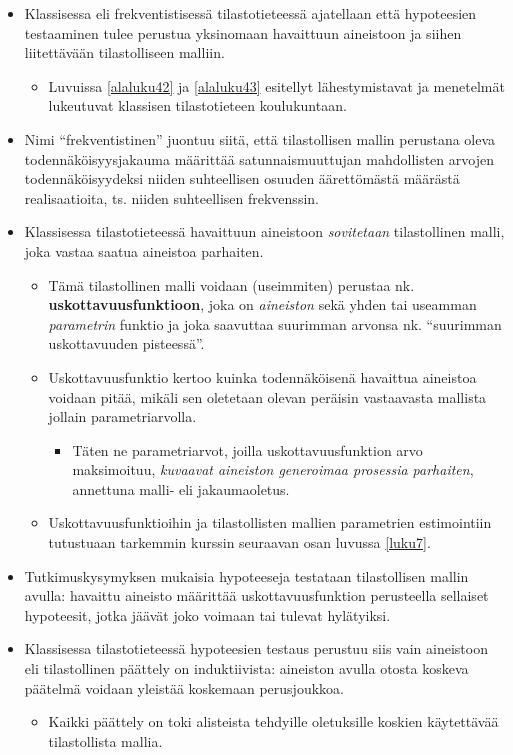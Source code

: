 \documentclass[
]{book}
\providecommand{\tightlist}{%
  \setlength{\itemsep}{0pt}\setlength{\parskip}{0pt}}
\begin{document}
\begin{itemize}
\item
  Klassisessa eli frekventistisessä tilastotieteessä ajatellaan että hypoteesien testaaminen tulee perustua yksinomaan havaittuun aineistoon ja siihen liitettävään tilastolliseen malliin.

  \begin{itemize}
  \tightlist
  \item
    Luvuissa \ref{alaluku42} ja \ref{alaluku43} esitellyt lähestymistavat ja menetelmät lukeutuvat klassisen tilastotieteen koulukuntaan.
  \end{itemize}
\item
  Nimi ``frekventistinen'' juontuu siitä, että tilastollisen mallin perustana oleva todennäköisyysjakauma määrittää satunnaismuuttujan mahdollisten arvojen todennäköisyydeksi niiden suhteellisen osuuden äärettömästä määrästä realisaatioita, ts. niiden suhteellisen frekvenssin.
\item
  Klassisessa tilastotieteessä havaittuun aineistoon \emph{sovitetaan} tilastollinen malli, joka vastaa saatua aineistoa parhaiten.

  \begin{itemize}
  \tightlist
  \item
    Tämä tilastollinen malli voidaan (useimmiten) perustaa nk. \textbf{uskottavuusfunktioon}, joka on \emph{aineiston} sekä yhden tai useamman \emph{parametrin} funktio ja joka saavuttaa suurimman arvonsa nk. ``suurimman uskottavuuden pisteessä''.
  \item
    Uskottavuusfunktio kertoo kuinka todennäköisenä havaittua aineistoa voidaan pitää, mikäli sen oletetaan olevan peräisin vastaavasta mallista jollain parametriarvolla.

    \begin{itemize}
    \tightlist
    \item
      Täten ne parametriarvot, joilla uskottavuusfunktion arvo maksimoituu, \emph{kuvaavat aineiston generoimaa prosessia parhaiten}, annettuna malli- eli jakaumaoletus.
    \end{itemize}
  \item
    Uskottavuusfunktioihin ja tilastollisten mallien parametrien estimointiin tutustuaan tarkemmin kurssin seuraavan osan luvussa \ref{luku7}.
  \end{itemize}
\item
  Tutkimuskysymyksen mukaisia hypoteeseja testataan tilastollisen mallin avulla: havaittu aineisto määrittää uskottavuusfunktion perusteella sellaiset hypoteesit, jotka jäävät joko voimaan tai tulevat hylätyiksi.
\item
  Klassisessa tilastotieteessä hypoteesien testaus perustuu siis vain aineistoon eli tilastollinen päättely on induktiivista: aineiston avulla otosta koskeva päätelmä voidaan yleistää koskemaan perusjoukkoa.

  \begin{itemize}
  \tightlist
  \item
    Kaikki päättely on toki alisteista tehdyille oletuksille koskien käytettävää tilastollista mallia.
  \end{itemize}
\end{itemize}
\end{document}
